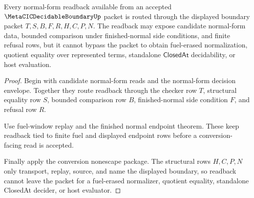 \begin{theorem}
\label{thm:metacic-decidable-boundary-normal-form-readback}
Every normal-form readback available from an accepted $\MetaCICDecidableBoundaryUp$ packet is routed through the displayed boundary packet $T,S,B,F,R,H,C,P,N$. The readback may expose candidate normal-form data, bounded comparison under finished-normal side conditions, and finite refusal rows, but it cannot bypass the packet to obtain fuel-erased normalization, quotient equality over represented terms, standalone $\mathsf{ClosedAt}$ decidability, or host evaluation.
\end{theorem}
\begin{proof}
Begin with candidate normal-form reads and the normal-form decision envelope. Together they route readback through the checker row $T$, structural equality row $S$, bounded comparison row $B$, finished-normal side condition $F$, and refusal row $R$.

Use fuel-window replay and the finished normal endpoint theorem. These keep readback tied to finite fuel and displayed endpoint rows before a conversion-facing read is accepted.

Finally apply the conversion nonescape package. The structural rows $H,C,P,N$ only transport, replay, source, and name the displayed boundary, so readback cannot leave the packet for a fuel-erased normalizer, quotient equality, standalone ClosedAt decider, or host evaluator.
\end{proof}

